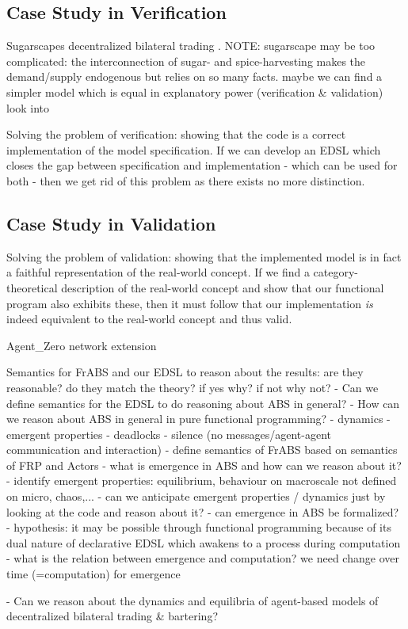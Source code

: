 \subsection{Case Study in Verification}
Sugarscapes decentralized  bilateral trading . NOTE: sugarscape may be too complicated: the interconnection of sugar- and spice-harvesting makes the demand/supply endogenous but relies on so many facts. maybe we can find a simpler model which is equal in explanatory power (verification \& validation)
look into \cite{botta_functional_2011}

Solving the problem of verification: showing that the code is a correct implementation of the model specification. If we can develop an EDSL which closes the gap between specification and implementation - which can be used for both - then we get rid of this problem as there exists no more distinction. 

\subsection{Case Study in Validation}
Solving the problem of validation: showing that the implemented model is in fact a faithful representation of the real-world concept. If we find a category-theoretical description of the real-world concept and show that our functional program also exhibits these, then it must follow that our implementation \textit{is} indeed equivalent to the real-world concept and thus valid.

Agent\_Zero network extension

Semantics for FrABS and our EDSL to reason about the results: are they reasonable? do they match the theory? if yes why? if not why not?
	- Can we define semantics for the EDSL to do reasoning about ABS in general?
	- How can we reason about ABS in general in pure functional programming?
		- dynamics
		- emergent properties
		- deadlocks
		- silence (no messages/agent-agent communication and interaction)
		- define semantics of FrABS based on semantics of FRP and Actors
		- what is emergence in ABS and how can we reason about it? 
			- identify emergent properties: equilibrium, behaviour on macroscale not defined on micro, chaos,...
			- can we anticipate emergent properties / dynamics just by looking at the code and reason about it?
			- can emergence in ABS be formalized?
				- hypothesis: it may be possible through functional programming because of its dual nature of declarative EDSL which awakens to a process during computation
					- what is the relation between emergence and computation? we need change over time (=computation) for emergence
					
		- Can we reason about the dynamics and equilibria of agent-based models of decentralized bilateral trading \& bartering?